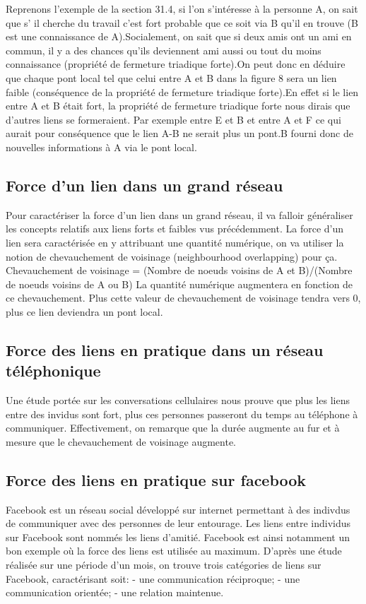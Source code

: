 Reprenons l'exemple de la section 31.4, si l'on s'intéresse à la personne A, on sait que s' il cherche du travail c'est fort probable que ce soit via B qu'il en trouve (B est une connaissance de A).Socialement, on sait que si deux amis ont un ami en commun, il y a des chances qu'ils deviennent ami aussi ou tout du moins connaissance (propriété de fermeture triadique forte).On peut donc en déduire que chaque pont local tel que celui entre A et B dans la figure 8 sera un lien faible (conséquence de la propriété de fermeture triadique forte).En effet si le lien entre A et B était fort, la propriété de fermeture triadique forte nous dirais que d'autres liens se formeraient. Par exemple entre E et B et entre A et F ce qui aurait pour conséquence que le lien A-B ne serait plus un pont.B fourni donc de nouvelles informations à A via le pont local.
\newline
\subsection{Force d'un lien dans un grand réseau}
Pour caractériser la force d'un lien dans un grand réseau, il va falloir généraliser les concepts relatifs aux liens forts et faibles vus précédemment.
La force d'un lien sera caractérisée en y attribuant une quantité numérique, on va utiliser la notion de chevauchement de voisinage (neighbourhood overlapping) pour ça.
Chevauchement de voisinage = (Nombre de noeuds voisins de A et B)/(Nombre de noeuds voisins de A ou B)
La quantité numérique augmentera en fonction de ce chevauchement. Plus cette valeur de chevauchement de voisinage tendra vers 0, plus ce lien deviendra un pont local.
\newline
\subsection{Force des liens en pratique dans un réseau téléphonique}
Une étude portée sur les conversations cellulaires nous prouve que plus les liens entre des invidus sont fort, plus ces personnes passeront du temps au téléphone à communiquer. Effectivement, on remarque que la durée augmente au fur et à mesure que le chevauchement de voisinage augmente.
\newline
\subsection{Force des liens en pratique sur facebook}
Facebook est un réseau social développé sur internet permettant à des indivdus de communiquer avec des personnes de leur entourage.
Les liens entre individus sur Facebook sont nommés les liens d'amitié.
Facebook est ainsi notamment un bon exemple où la force des liens est utilisée au maximum.
D'après une étude réalisée sur une période d'un mois, on trouve trois catégories de liens sur Facebook, caractérisant soit:
- une communication réciproque;
- une communication orientée;
- une relation maintenue.

